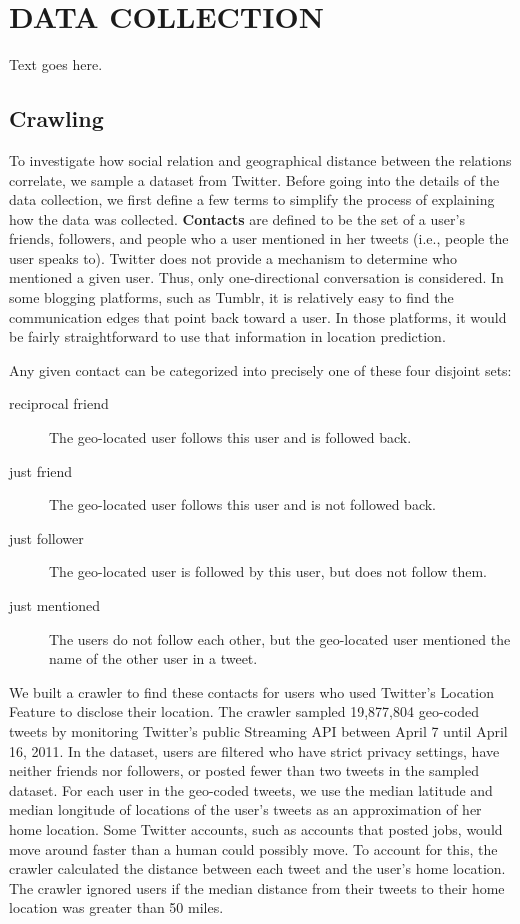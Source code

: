 \chapter{\uppercase {Data Collection}}

Text goes here.

\section{Crawling}
To investigate how social relation and geographical distance between the
relations correlate, we sample a dataset from Twitter.  Before going into the
details of the data collection, we first define a few terms to simplify the
process of explaining how the data was collected.  \textbf{Contacts} are
defined to be the set of a user's friends, followers, and people who a user
mentioned in her tweets (i.e., people the user speaks to).  Twitter does not
provide a mechanism to determine who mentioned a given user.  Thus, only
one-directional conversation is considered.  In some blogging platforms, such
as Tumblr, it is relatively easy to find the communication edges that point
back toward a user.  In those platforms, it would be fairly straightforward to
use that information in location prediction.

Any given contact can be categorized into precisely one of these four disjoint
sets:
\begin{description}
\item[reciprocal friend] The geo-located user follows this user and is followed
    back.
\item[just friend] The geo-located user follows this user and is not followed
    back.
\item[just follower] The geo-located user is followed by this user, but does
    not follow them.
\item[just mentioned] The users do not follow each other, but the geo-located
    user mentioned the name of the other user in a tweet.
\end{description}

We built a crawler to find these contacts for users who used Twitter's Location
Feature to disclose their location.
The crawler sampled 19,877,804 geo-coded tweets by monitoring Twitter's public
Streaming API between April 7 until April 16, 2011.
In the dataset, users are filtered who have strict privacy settings, have
neither friends nor followers, or posted fewer than two tweets in the sampled
dataset.
For each user in the geo-coded tweets, we use the median latitude and median
longitude of locations of the user's tweets as an approximation of her home
location. 
Some Twitter accounts, such as accounts that posted jobs, would
move around faster than a human could possibly move. To account for this, the
crawler
calculated the distance between each tweet and the user's home location. The
crawler
ignored users if the median distance from their tweets to their home location
was greater than 50 miles.

